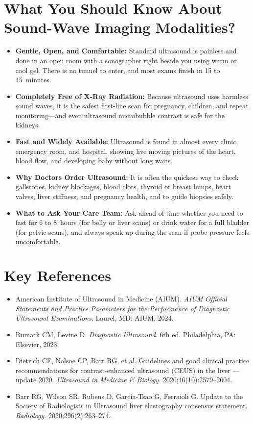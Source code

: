 \section{What You Should Know About Sound-Wave Imaging Modalities?}
\begin{itemize}
  \item \textbf{Gentle, Open, and Comfortable:} Standard ultrasound is painless and done in an open room with a sonographer right beside you using warm or cool gel. There is no tunnel to enter, and most exams finish in 15 to 45~minutes.
  \item \textbf{Completely Free of X-Ray Radiation:} Because ultrasound uses harmless sound waves, it is the safest first-line scan for pregnancy, children, and repeat monitoring---and even ultrasound microbubble contrast is safe for the kidneys.
  \item \textbf{Fast and Widely Available:} Ultrasound is found in almost every clinic, emergency room, and hospital, showing live moving pictures of the heart, blood flow, and developing baby without long waits.
  \item \textbf{Why Doctors Order Ultrasound:} It is often the quickest way to check gallstones, kidney blockages, blood clots, thyroid or breast lumps, heart valves, liver stiffness, and pregnancy health, and to guide biopsies safely.
  \item \textbf{What to Ask Your Care Team:} Ask ahead of time whether you need to fast for 6 to 8~hours (for belly or liver scans) or drink water for a full bladder (for pelvic scans), and always speak up during the scan if probe pressure feels uncomfortable.
\end{itemize}

\section{Key References}
\begin{itemize}
  \item American Institute of Ultrasound in Medicine (AIUM). \emph{AIUM Official Statements and Practice Parameters for the Performance of Diagnostic Ultrasound Examinations}. Laurel, MD: AIUM, 2024.
  \item Rumack CM, Levine D. \emph{Diagnostic Ultrasound}. 6th ed. Philadelphia, PA: Elsevier, 2023.
  \item Dietrich CF, Nolsoe CP, Barr RG, et al. Guidelines and good clinical practice recommendations for contrast-enhanced ultrasound (CEUS) in the liver --- update 2020. \emph{Ultrasound in Medicine \& Biology}. 2020;46(10):2579--2604.
  \item Barr RG, Wilson SR, Rubens D, Garcia-Tsao G, Ferraioli G. Update to the Society of Radiologists in Ultrasound liver elastography consensus statement. \emph{Radiology}. 2020;296(2):263--274.
\end{itemize}
